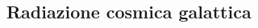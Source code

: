 \documentclass[9pt]{beamer}
\begin{document}
\begin{frame} [fragile]
\begin{columns}
\begin{column}{0.50\textwidth}
    \end{column}
\end{columns}


\end{frame}


\subsection{Radiazione cosmica galattica}
\end{document}
